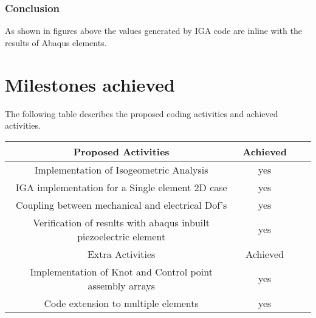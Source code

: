 \documentclass[11pt]{article}
\begin{document}
\subsubsection{Conclusion}
As shown in figures above the values generated by IGA code are inline with the results of Abaqus elements. 




\section{Milestones achieved}
The following table describes the proposed coding activities and achieved activities.


\begin{center}
	\begin{tabular}{ |c|c|c|c| } 
		\hline
		Proposed Activities & Achieved \\
		\hline
		Implementation of Isogeometric Analysis & yes \\ 
		IGA implementation for a Single element 2D case& yes \\ 
		Coupling between mechanical and electrical Dof’s & yes \\ 
		Verification of results with abaqus inbuilt piezoelectric element & yes \\ 
		\hline
		Extra Activities & Achieved \\
		\hline
		Implementation of Knot and Control point assembly arrays & yes \\
		Code extension to multiple elements & yes \\
		\hline
	\end{tabular}
\end{center}






\noindent

 
\end{document}
